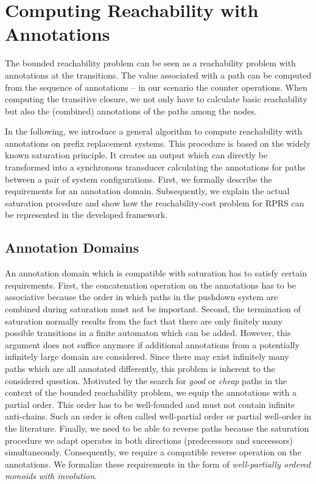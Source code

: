 \documentclass{LMCS}
\newcommand{\RPRS}{\textsf{RPRS}}
\begin{document}
\section{Computing Reachability with Annotations}
\label{sec:ReachabilityWithAnnotations}

The bounded reachability problem can be seen as a reachability problem with
annotations at the transitions. The value associated with a path can be computed from the
sequence of annotations -- in our scenario the counter operations. When
computing the transitive closure, we not only have to calculate basic 
reachability but also the (combined) annotations of the paths among the nodes.

In the following, we introduce a general algorithm to compute reachability with
annotations on prefix replacement systems. This procedure is based on the
widely known saturation principle. It creates an output which can directly be
transformed into a synchronous transducer calculating the annotations for paths
between a pair of system configurations. First, we formally describe the
requirements for an annotation domain. Subsequently, we explain the actual
saturation procedure and show how the reachability-cost problem for \RPRS{} can
be represented in the developed framework.

\subsection{Annotation Domains}

An annotation domain which is compatible with saturation has to satisfy certain
requirements. First, the concatenation operation on the annotations has to be
associative because the order in which paths in the pushdown system are
combined during saturation must not be important. Second, the termination of
saturation normally results from the fact that there are only finitely many
possible transitions in a finite automaton which can be added. However, this
argument does not suffice anymore if additional annotations from a potentially
infinitely large domain are considered. Since there may exist infinitely many
paths which are all annotated differently, this problem is inherent to the
considered question. Motivated by the search for \emph{good} or \emph{cheap}
paths in the context of the bounded reachability problem, we equip the
annotations with a partial order. This order has to be well-founded and must
not contain infinite anti-chains. Such an order is often called well-partial
order or partial well-order in the literature. Finally, we need to be able to
reverse paths because the saturation procedure we adapt operates in both directions
(predecessors and successors) simultaneously. Consequently, we require a
compatible reverse operation on the annotations. We formalize these requirements in the
form of \emph{well-partially ordered monoids with involution}.
\end{document}
